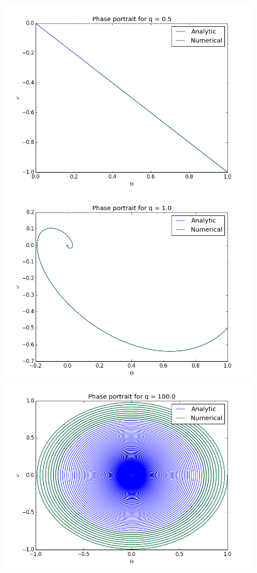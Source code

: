 \documentclass[12pt]{article}
\begin{document}
\begin{figure}[]
\centering
\begin{minipage}[t]{0.45\textwidth}
\includegraphics[width=\textwidth]{both05.png}
\end{minipage}
\begin{minipage}[t]{0.45\textwidth}
\includegraphics[width=\textwidth]{both1.png}
\end{minipage}
\begin{minipage}[t]{0.45\textwidth}
\includegraphics[width=\textwidth]{both100}

\end{minipage}
\end{figure}
\end{document}
